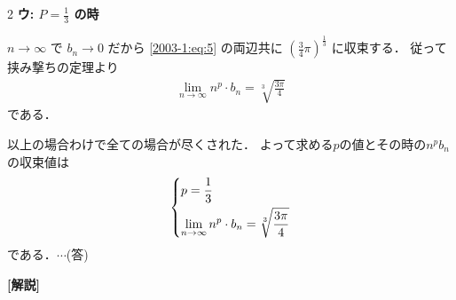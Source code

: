 \documentclass[../../../../main.tex]{subfiles}
\begin{document}
\begin{multicols}{2}
    \vspace{5pt}
    \textbf{ウ: $P = \frac{1}{3}$ の時}

    $n \to \infty$ で $b_n \to 0$ だから \cref{2003-1:eq:5} の両辺共に $\left(\frac{3}{4}\pi\right)^{\frac{1}{3}}$ に収束する．
    従って挟み撃ちの定理より
    \begin{align*}
        \lim_{n\to\infty} n^p \cdot b_n = \sqrt[3]{\frac{3\pi}{4}}
    \end{align*}
    である．

    \vspace{5pt}
    以上の場合わけで全ての場合が尽くされた．
    よって求める$p$の値とその時の$n^{p}b_n$の収束値は
    \begin{align*}
        \begin{dcases}
            p = \frac{1}{3} \\
            \lim_{n\to\infty} n^p \cdot b_n = \sqrt[3]{\frac{3\pi}{4}}
        \end{dcases}
    \end{align*}
    である．$\cdots$(答)
    \vspace{10pt}

    {\bf[解説]}

    \newpage
\end{multicols}
\end{document}
